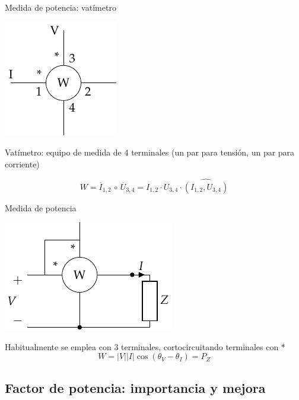 \documentclass[aspectratio=169, usenames,svgnames,dvipsnames]{beamer}
\begin{document}

\begin{frame}{Medida de potencia: vatímetro}
    \begin{center}
    \includegraphics[height=0.5\textheight]{../figs/vatimetro_2.pdf}
    \end{center}
    
    \alert{Vatímetro}: equipo de medida de 4 terminales (un par para tensión, un par para corriente)
    
    \begin{equation*}
        W=\overline{I}_{1,2}\,\circ\,\overline{U}_{3,4}=I_{1,2}\cdot U_{3,4}\cdot \widehat{(I_{1,2}, U_{3,4})}
	\end{equation*}
\end{frame}


\begin{frame}{Medida de potencia}
    \begin{center}
        \includegraphics[height=0.5\textheight]{../figs/vatimetro_Z.pdf}
    \end{center}
    
    Habitualmente se emplea con 3 terminales, cortocircuitando terminales con *
    \[
      \boxed{W = |V| |I| \cos(\theta_V - \theta_I) = P_Z}
    \]
\end{frame}


\subsection{Factor de potencia: importancia y mejora}
\end{document}
